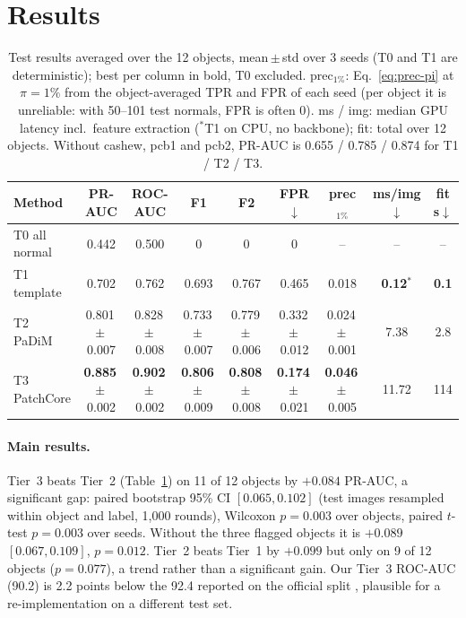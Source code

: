 \section{Results}
\label{sec:results}

\begin{table}[t]
  \centering
  \footnotesize
  \setlength{\tabcolsep}{3pt}
  \begin{tabular}{@{}lcccccccc@{}}
    \toprule
    Method & PR-AUC & ROC-AUC & F1 & F2 & FPR$\downarrow$ & prec$_{1\%}$ & ms/img$\downarrow$ & fit s$\downarrow$ \\
    \midrule
    T0 all normal & 0.442 & 0.500 & 0 & 0 & 0 & -- & -- & -- \\
    T1 template & 0.702 & 0.762 & 0.693 & 0.767 & 0.465 & 0.018 & \textbf{0.12}$^\ast$ & \textbf{0.1} \\
    T2 PaDiM & 0.801\,$\pm$\,0.007 & 0.828\,$\pm$\,0.008 & 0.733\,$\pm$\,0.007 & 0.779\,$\pm$\,0.006
      & 0.332\,$\pm$\,0.012 & 0.024\,$\pm$\,0.001 & 7.38 & 2.8 \\
    T3 PatchCore & \textbf{0.885}\,$\pm$\,0.002 & \textbf{0.902}\,$\pm$\,0.002 & \textbf{0.806}\,$\pm$\,0.009
      & \textbf{0.808}\,$\pm$\,0.008 & \textbf{0.174}\,$\pm$\,0.021 & \textbf{0.046}\,$\pm$\,0.005 & 11.72 & 114 \\
    \bottomrule
  \end{tabular}
  \caption{Test results averaged over the 12 objects, mean\,$\pm$\,std over 3 seeds (T0 and T1 are
    deterministic); best per column in bold, T0 excluded. prec$_{1\%}$: Eq.~\ref{eq:prec-pi} at
    $\pi = 1\%$ from the object-averaged TPR and FPR of each seed (per object it is unreliable: with
    50--101 test normals, FPR is often 0). ms / img: median GPU latency incl.\ feature extraction ($^\ast$T1 on CPU, no backbone);
    fit: total over 12 objects. Without cashew, pcb1 and pcb2, PR-AUC is 0.655 / 0.785 / 0.874 for
    T1 / T2 / T3.}
  \label{tab:main}
\end{table}

\paragraph{Main results.}
Tier~3 beats Tier~2 (Table~\ref{tab:main}) on 11 of 12 objects by $+0.084$ PR-AUC, a significant gap:
paired bootstrap 95\% CI $[0.065, 0.102]$ (test images resampled within object and label, 1,000
rounds), Wilcoxon $p = 0.003$ over objects, paired $t$-test $p = 0.003$ over seeds.
Without the three flagged objects it is $+0.089$ $[0.067, 0.109]$, $p = 0.012$.
Tier~2 beats Tier~1 by $+0.099$ but only on 9 of 12 objects ($p = 0.077$), a trend rather than a
significant gain.
Our Tier~3 ROC-AUC (90.2) is 2.2 points below the 92.4 reported on the official split
\citep{zou2022spot}, plausible for a re-implementation on a different test set.

